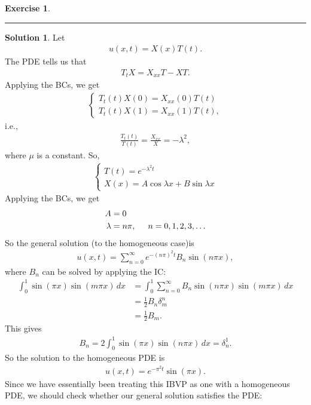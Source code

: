 \documentclass{article}
\theoremstyle{definition}
\newtheorem*{exer*}{Exercise}
\newtheorem*{sln*}{Solution}
\begin{document}
\begin{exer*}
	\noindent\rule{\textwidth}{0.5pt}
	\begin{sln*}
		Let
		\begin{align*}
		u(x,t) = X(x)T(t).
		\end{align*}
		The PDE tells us that
		\begin{align*}
		T_t X = X_{xx} T - XT.
		\end{align*}
		Applying the BCs, we get
		\begin{align*}
		\begin{cases}
		T_t(t)X(0) = X_{xx}(0)T(t)\\
		T_t(t)X(1) = X_{xx}(1)T(t),
		\end{cases}
		\end{align*}
		i.e.,
		\begin{align*}
		\frac{T_t(t)}{T(t)} = \frac{X_{xx}}{X} = -\lambda^2,
		\end{align*}
		where $\mu$ is a constant. So,
		\begin{align*}
		\begin{cases}
		T(t) = e^{-\lambda^2 t}\\
		X(x) = A\cos\lambda x + B\sin\lambda x
		\end{cases}
		\end{align*}
		Applying the BCs, we get
		\begin{align*}
		A &= 0\\
		\lambda &= n\pi, \hspace{0.5cm} n = 0,1,2,3,\dots
		\end{align*}
		So the general solution (to the homogeneous case)is
		\begin{align*}
		u(x,t) = \sum_{n=0}^\infty e^{-(n\pi)^2 t}B_n \sin(n\pi x),
		\end{align*}
		where $B_n$ can be solved by applying the IC:
		\begin{align*}
		\int^1_0 \sin(\pi x)\sin(m\pi x)\,dx &= \int^1_0 \sum_{n=0}^\infty B_n \sin(n\pi x)\sin(m\pi x)\,dx\\
		&= \frac{1}{2}B_n \delta^n_m\\
		&= \frac{1}{2}B_m.
		\end{align*}
		This gives
		\begin{align*}
		B_n = 2\int^1_0 \sin(\pi x)\sin(n\pi x)\,dx = \delta^1_n.
		\end{align*}
		So the solution to the homogeneous PDE is
		\begin{align*}
		u(x,t) = e^{-\pi^2 t}\sin(\pi x).
		\end{align*}
		Since we have essentially been treating this IBVP as one with a homogeneous PDE, we should check whether our general solution satisfies the PDE:

\end{sln*}
\end{exer*}
\end{document}
